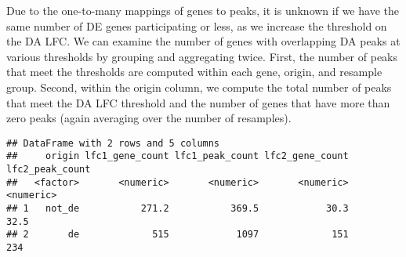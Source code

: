 \documentclass[
]{article}
\newenvironment{Shaded}{}{}
\newcommand{\DataTypeTok}[1]{\textcolor[rgb]{0.56,0.13,0.00}{#1}}
\newcommand{\DecValTok}[1]{\textcolor[rgb]{0.25,0.63,0.44}{#1}}
\newcommand{\KeywordTok}[1]{\textcolor[rgb]{0.00,0.44,0.13}{\textbf{#1}}}
\newcommand{\NormalTok}[1]{#1}
\newcommand{\OperatorTok}[1]{\textcolor[rgb]{0.40,0.40,0.40}{#1}}
\newcommand{\OtherTok}[1]{\textcolor[rgb]{0.00,0.44,0.13}{#1}}
\newcommand{\StringTok}[1]{\textcolor[rgb]{0.25,0.44,0.63}{#1}}
\begin{document}
Due to the one-to-many mappings of genes to peaks, it is unknown if we have the
same number of DE genes participating or less, as we increase the threshold on
the DA LFC. We can examine the number of genes with overlapping DA peaks at
various thresholds by grouping and aggregating twice. First, the number of
peaks that meet the thresholds are computed within each gene, origin, and
resample group. Second, within the origin column, we compute the total number
of peaks that meet the DA LFC threshold and the number of genes that have more
than zero peaks (again averaging over the number of resamples).

\begin{Shaded}
\end{Shaded}

\begin{verbatim}
## DataFrame with 2 rows and 5 columns
##     origin lfc1_gene_count lfc1_peak_count lfc2_gene_count lfc2_peak_count
##   <factor>       <numeric>       <numeric>       <numeric>       <numeric>
## 1   not_de           271.2           369.5            30.3            32.5
## 2       de             515            1097             151             234
\end{verbatim}
\end{document}
